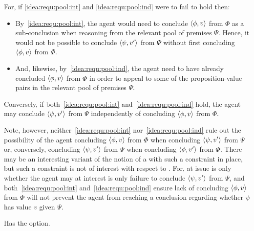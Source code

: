 \begin{note}
    For, if \ref{idea:requ:pool:int} and \ref{idea:requ:pool:ind} were to fail to hold then:
  \begin{itemize}
  \item
    By~\ref{idea:requ:pool:int}, the agent would need to conclude \(\langle \phi, v \rangle\) from \(\Phi\) as a sub-conclusion when reasoning from the relevant pool of premises \(\Psi\).
    Hence, it would not be possible to conclude \(\langle \psi, v' \rangle\) from \(\Psi\) without first concluding \(\langle \phi, v \rangle\) from \(\Phi\).
  \item
    And, likewise, by~\ref{idea:requ:pool:ind}, the agent need to have already concluded \(\langle \phi, v \rangle\) from \(\Phi\) in order to appeal to some of the proposition-value pairs in the relevant pool of premises \(\Psi\).
  \end{itemize}

  Conversely, if both~\ref{idea:requ:pool:int} and~\ref{idea:requ:pool:ind} hold, the agent may conclude \(\langle \psi, v' \rangle\) from \(\Psi\) independently of concluding \(\langle \phi, v \rangle\) from \(\Phi\).

  Note, however, neither~\ref{idea:requ:pool:int} nor~\ref{idea:requ:pool:ind} rule out the possibility of the agent concluding \(\langle \phi, v \rangle\) from \(\Phi\) when concluding \(\langle \psi, v' \rangle\) from \(\Psi\) or, conversely, concluding \(\langle \psi, v' \rangle\) from \(\Psi\) when concluding \(\langle \phi, v' \rangle\) from \(\Phi\).
  There may be an interesting variant of the notion of a \requ{} with such a constraint in place, but such a constraint is not of interest with respect to \qzS{}.
  For, at issue is only whether the agent may at interest is only failure to conclude \(\langle \psi, v' \rangle\) from \(\Psi\), and both~\ref{idea:requ:pool:int} and~\ref{idea:requ:pool:ind} ensure lack of concluding \(\langle \phi, v \rangle\) from \(\Phi\) will not prevent the agent from reaching a conclusion regarding whether \(\psi\) has value \(v\) given \(\Psi\).
\end{note}

\begin{note}
  \color{red}
  Has the option.
\end{note}

